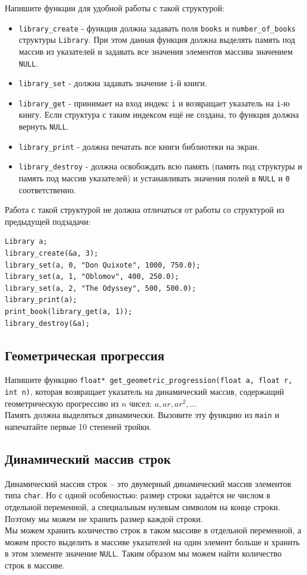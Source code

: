 \documentclass{article}
\begin{document}
\begin{enumerate}
Напишите функции для удобной работы с такой структурой:
\begin{itemize}
\item \texttt{library\_create} - функция должна задавать поля \texttt{books} и \texttt{number\_of\_books} структуры \texttt{Library}. При этом данная функция должна выделять память под массив из указателей и задавать все значения элементов массива значением \texttt{NULL}.
\item \texttt{library\_set} - должна задавать значение \texttt{i}-й книги.
\item \texttt{library\_get} - принимает на вход индекс \texttt{i} и возвращает указатель на \texttt{i}-ю книгу. Если структура с таким индексом ещё не создана, то функция должна вернуть \texttt{NULL}.
\item \texttt{library\_print} - должна печатать все книги библиотеки на экран.
\item \texttt{library\_destroy} - должна освобождать всю память (память под структуры и память под массив указателей) и устанавливать значения полей в \texttt{NULL} и \texttt{0} соответственно.
\end{itemize}

Работа с такой структурой не должна отличаться от работы со структурой из предыдущей подзадачи:
\begin{lstlisting}
Library a;
library_create(&a, 3);
library_set(a, 0, "Don Quixote", 1000, 750.0);
library_set(a, 1, "Oblomov", 400, 250.0);
library_set(a, 2, "The Odyssey", 500, 500.0);
library_print(a);
print_book(library_get(a, 1));
library_destroy(&a);
\end{lstlisting}

\end{enumerate}
\subsection{Геометрическая прогрессия}
Напишите функцию \texttt{float* get\_geometric\_progression(float a, float r, int n)}, которая возвращает указатель на динамический массив, содержащий геометрическую прогрессию из $n$ чисел: 
$a, ar, ar^2, ...$\\
Память должна выделяться динамически. Вызовите эту функцию из \texttt{main} и напечатайте первые 10 степеней тройки.


\newpage
\subsection{Динамический массив строк}
Динамический массив строк -- это двумерный динамический массив элементов типа \texttt{char}. 
Но с одной особеностью: размер строки задаётся не числом в отдельной переменной, а специальным нулевым символом на конце строки. Поэтому мы можем не хранить размер каждой строки. \\
Мы можем хранить количество строк в таком массиве в отдельной переменной, а можем просто выделить в массиве указателей на один элемент больше и хранить в этом элементе значение \texttt{NULL}. Таким образом мы можем найти количество строк в массиве.\\
\end{document}
